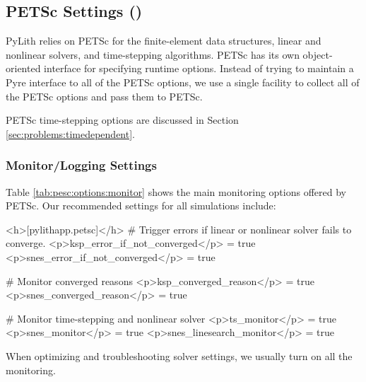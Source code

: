\subsection{PETSc Settings (\protect{})}
\label{sec:petsc:options}

PyLith relies on PETSc for the finite-element data structures, linear
and nonlinear solvers, and time-stepping algorithms. PETSc has its own
object-oriented interface for specifying runtime options. Instead of
trying to maintain a Pyre interface to all of the PETSc options, we
use a single  facility to collect all of the PETSc
options and pass them to PETSc.

PETSc time-stepping options are discussed in Section
\vref{sec:problems:timedependent}.

\subsubsection{Monitor/Logging Settings}

Table \vref{tab:pesc:options:monitor} shows the main monitoring
options offered by PETSc. Our recommended settings for all simulations
include:
\begin{cfg}
<h>[pylithapp.petsc]</h>
# Trigger errors if linear or nonlinear solver fails to converge.
<p>ksp_error_if_not_converged</p> = true
<p>snes_error_if_not_converged</p> = true

# Monitor converged reasons
<p>ksp_converged_reason</p> = true
<p>snes_converged_reason</p> = true

# Monitor time-stepping and nonlinear solver
<p>ts_monitor</p> = true
<p>snes_monitor</p> = true
<p>snes_linesearch_monitor</p> = true
\end{cfg}
When optimizing and troubleshooting solver settings, we usually turn on all the monitoring.

